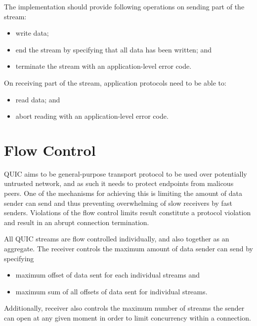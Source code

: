 The implementation should provide following operations on sending part of the stream:

\begin{itemize}

  \item write data;
  \item end the stream by specifying that all data has been written; and
  \item terminate the stream with an application-level error code.

\end{itemize}

On receiving part of the stream, application protocols need to be able to:

\begin{itemize}

  \item read data; and
  \item abort reading with an application-level error code.

\end{itemize}


\section{Flow Control}

QUIC aims to be general-purpose transport protocol to be used over potentially untrusted network,
and as such it needs to protect endpoints from malicous peers. One of the mechanisms for achieving
this is limiting the amount of data sender can send and thus preventing overwhelming of slow
receivers by fast senders. Violations of the flow control limits result constitute a protocol
violation and result in an abrupt connection termination.

All QUIC streams are flow controlled individually, and also together as an aggregate. The receiver
controls the maximum amount of data sender can send by specifying

\begin{itemize}
  \item maximum offset of data sent for each individual streams and
  \item maximum sum of all offsets of data sent for individual streams.
\end{itemize}

Additionally, receiver also controls the maximum number of streams the sender can open at any given
moment in order to limit concurrency within a connection.

